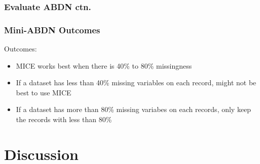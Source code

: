 \documentclass{beamer}
\begin{document}
\begin{frame}
  \frametitle{Evaluate ABDN ctn.}
\end{frame}

\begin{frame}
  \frametitle{Mini-ABDN Outcomes}
  Outcomes:
  \begin{itemize}
    \item MICE works best when there is 40\% to 80\% missingness
    \item If a dataset has less than 40\% missing variables on each record, might not be best to use MICE
    \item If a dataset has more than 80\% missing variabes on each records, only keep the records with less than 80\%
  \end{itemize}
\end{frame}

\section{Discussion}
\end{document}
